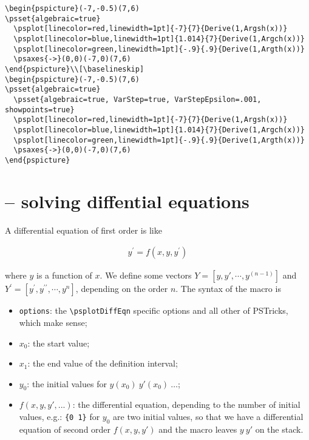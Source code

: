 \documentclass[11pt,english,BCOR10mm,DIV12,bibliography=totoc,parskip=false,smallheadings
    headexclude,footexclude,oneside]{pst-doc}
\begin{document}
\begin{lstlisting}
\begin{pspicture}(-7,-0.5)(7,6)
\psset{algebraic=true}
  \psplot[linecolor=red,linewidth=1pt]{-7}{7}{Derive(1,Argsh(x))}
  \psplot[linecolor=blue,linewidth=1pt]{1.014}{7}{Derive(1,Argch(x))}
  \psplot[linecolor=green,linewidth=1pt]{-.9}{.9}{Derive(1,Argth(x))}
  \psaxes{->}(0,0)(-7,0)(7,6)
\end{pspicture}\\[\baselineskip]
\begin{pspicture}(-7,-0.5)(7,6)
\psset{algebraic=true}
  \psset{algebraic=true, VarStep=true, VarStepEpsilon=.001, showpoints=true}
  \psplot[linecolor=red,linewidth=1pt]{-7}{7}{Derive(1,Argsh(x))}
  \psplot[linecolor=blue,linewidth=1pt]{1.014}{7}{Derive(1,Argch(x))}
  \psplot[linecolor=green,linewidth=1pt]{-.9}{.9}{Derive(1,Argth(x))}
  \psaxes{->}(0,0)(-7,0)(7,6)
\end{pspicture}
\end{lstlisting}


\clearpage
\section[\nxLcs{psplotDiffEqn} -- solving diffential equations]%
  { -- solving diffential equations}


 A differential equation of first order is like

\begin{align} y^\prime=f(x,y,y^\prime) \end{align}


where $y$ is a function of $x$. We define some vectors $Y=[y, y',
\cdots , y^{(n-1)}]$ and $Y^\prime=[y^\prime, y^{\prime\prime},
\cdots , y^{n}]$, depending on the order $n$. The syntax of the
macro is

\begin{BDef}
\OptArgs{}
\end{BDef}

\begin{itemize}\setlength\itemsep{0pt}\setlength\parsep{0pt}\setlength\parskip{0pt}
\item \verb+options+: the \verb+\psplotDiffEqn+ specific options and all other of PSTricks, which
make sense;
\item $x_0$: the start value;
\item $x_1$: the end value of the definition interval;
\item $y_0$: the initial values for $y(x_0)\ y'(x_0)\ \ldots$;
\item $f(x,y,y',...)$: the differential equation, depending to the number of initial values, e.g.:
    \verb+{0 1}+ for $y_0$ are two initial values, so that we have a differential equation of
    second order $f(x,y,y')$ and the macro leaves $y\ y'$ on the stack.
\end{itemize}
\end{document}
